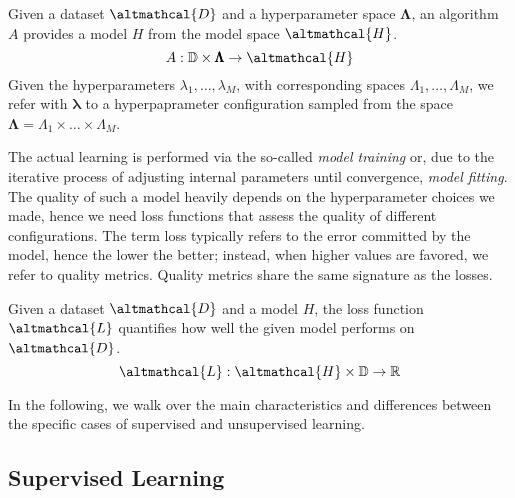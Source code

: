 \documentclass[a4paper,12pt,times,numbered,print,index]{Classes/PhDThesisPSnPDF}
\begin{document}
\begin{definition}\label{def:algorithm}
    Given a dataset $\altmathcal{D}$ and a hyperparameter space $\pmb{\Lambda}$, an algorithm $A$ provides a model $H$ from the model space $\altmathcal{H}$.
    \begin{equation*}\label{eq:algorithm}
        A: \mathbb{D} \times \pmb{\Lambda} \rightarrow \altmathcal{H}
    \end{equation*}
    Given the hyperparameters $\lambda_1, \dots, \lambda_M$, with corresponding spaces $\Lambda_1, \dots, \Lambda_M$, we refer with $\pmb{\lambda}$ to a hyperpaprameter configuration sampled from the space $\pmb{\Lambda} = \Lambda_1 \times \dots \times \Lambda_M$.
\end{definition}

The actual learning is performed via the so-called \textit{model training} or, due to the iterative process of adjusting internal parameters until convergence, \textit{model fitting}.
The quality of such a model heavily depends on the hyperparameter choices we made, hence we need loss functions that assess the quality of different configurations.
The term loss typically refers to the error committed by the model, hence the lower the better; instead, when higher values are favored, we refer to quality metrics.
Quality metrics share the same signature as the losses.

\begin{definition}\label{def:loss}
    Given a dataset $\altmathcal{D}$ and a model $H$, the loss function $\altmathcal{L}$ quantifies how well the given model performs on $\altmathcal{D}$.
    \begin{equation*}\label{eq:loss}
        \altmathcal{L}: \altmathcal{H} \times \mathbb{D} \rightarrow \mathbb{R}
    \end{equation*}
\end{definition}

In the following, we walk over the main characteristics and differences between the specific cases of supervised and unsupervised learning.

\subsection{Supervised Learning}
\end{document}
